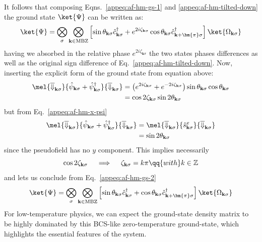 It follows that composing Eqns.~\eqref{appeq:af-hm-gs-1} and \eqref{appeq:af-hm-tilted-down} the ground state $\ket{\Psi}$ can be written as:
\begin{equation}\label{appeq:af-hm-gs-2}
	\ket{\Psi} = \bigotimes_\sigma \bigotimes_{\mathbf{k}\in\mathrm{MBZ}} \left[
		\sin\theta_{\mathbf{k}\sigma} \hat c_{\mathbf{k}\sigma}^\dagger + e^{2i\zeta_{\mathbf{k}\sigma}} \cos \theta_{\mathbf{k}\sigma} \hat c_{\mathbf{k}+\bm{\pi}\sigma}^\dagger
	\right] \ket{\Omega_{\mathbf{k}\sigma}}
\end{equation}
having we absorbed in the relative phase $e^{2i\zeta_{\mathbf{k}\sigma}}$ the two states phases differences as well as the original sign difference of Eq.~\eqref{appeq:af-hm-tilted-down}. Now, inserting the explicit form of the ground state from equation above:
\[
\begin{aligned}
	\mel{\overline{\Downarrow}_{\mathbf{k}\sigma}}{\hat \psi_{\mathbf{k}\sigma} + \hat \psi_{\mathbf{k}\sigma}^\dagger}{\overline{\Downarrow}_{\mathbf{k}\sigma}} &= \left(e^{2i\zeta_{\mathbf{k}\sigma}} + e^{-2i\zeta_{\mathbf{k}\sigma}}\right) \sin\theta_{\mathbf{k}\sigma} \cos\theta_{\mathbf{k}\sigma} \\
	&= \cos 2\zeta_{\mathbf{k}\sigma} \sin 2\theta_{\mathbf{k}\sigma}
\end{aligned}
\]
but from Eq.~\eqref{appeq:af-hm-x-psi}
\[
\begin{aligned}
	\mel{\overline{\Downarrow}_{\mathbf{k}\sigma}}{\hat \psi_{\mathbf{k}\sigma} + \hat \psi_{\mathbf{k}\sigma}^\dagger}{\overline{\Downarrow}_{\mathbf{k}\sigma}} &= 	\mel{\overline{\Downarrow}_{\mathbf{k}\sigma}}{\hat s_{\mathbf{k}\sigma}^x}{\overline{\Downarrow}_{\mathbf{k}\sigma}} \\
	&= \sin 2\theta_{\mathbf{k}\sigma}
\end{aligned}
\]
since the pseudofield has no $y$ component. This implies necessarily
\[
	\cos 2\zeta_{\mathbf{k}\sigma}
	\quad\implies\quad
	\zeta_{\mathbf{k}\sigma} = k\pi
	\qq{with}
	k\in\mathbb{Z}
\]
and lets us conclude from Eq.~\eqref{appeq:af-hm-gs-2}
\begin{equation}\label{appeq:af-hm-gs-3}
	\ket{\Psi} = \bigotimes_\sigma \bigotimes_{\mathbf{k}\in\mathrm{MBZ}} \left[
	\sin \theta_{\mathbf{k}\sigma} \hat c_{\mathbf{k}\sigma}^\dagger + \cos \theta_{\mathbf{k}\sigma} \hat c_{\mathbf{k}+\bm{\pi}\sigma}^\dagger
	\right] \ket{\Omega_{\mathbf{k}\sigma}}
\end{equation}
For low-temperature physics, we can expect the ground-state density matrix to be highly dominated by this BCS-like zero-temperature ground-state, which highlights the essential features of the system. 

